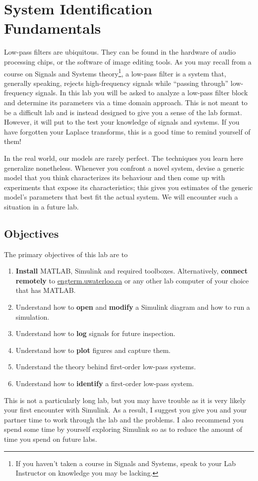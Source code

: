 \chapter{System Identification Fundamentals}\label{Lab:1}
Low-pass filters are ubiquitous. They can be found in the hardware of
audio processing chips, or the software of image editing tools. As you may
recall from a course on Signals and Systems theory\footnote{If you haven't
taken a course in Signals and Systems, speak to your Lab Instructor on
knowledge you may be lacking.}, a low-pass filter
is a system that, generally speaking, rejects high-frequency signals while
``passing through'' low-frequency signals. In this lab you will be asked
to analyze a low-pass filter block and determine its parameters via a time
domain approach. This is not meant to be a difficult lab and is instead
designed to give you a sense of the lab format. However, it will put to the
test your knowledge of signals and systems. If you have forgotten your
Laplace transforms, this is a good time to remind yourself of them!

In the real world, our models are rarely perfect. The techniques
you learn here generalize nonetheless. Whenever you confront a novel system,
devise a generic model that you think characterizes its behaviour and then
come up with experiments that expose its characteristics; this gives you
estimates of the generic model's parameters that best fit the actual system.
We will encounter such a situation in a future lab.

\section{Objectives}
The primary objectives of this lab are to
\begin{enumerate}[label=(\arabic*)]
  \item{
    \textbf{Install} MATLAB, Simulink and required toolboxes.
    Alternatively, \textbf{connect remotely} to
    \url{engterm.uwaterloo.ca} or any other lab computer of your choice
    that has MATLAB.
  }
  \item{
    Understand how to \textbf{open} and \textbf{modify}
    a Simulink diagram and how to run a simulation.
  }
  \item{
    Understand how to \textbf{log} signals for future inspection.
  }
  \item{
    Understand how to \textbf{plot} figures and capture them.
  }
  \item{
    Understand the theory behind first-order low-pass systems.
  }
  \item{
    Understand how to \textbf{identify} a first-order low-pass system.
  }
\end{enumerate}
This is not a particularly long lab, but you may have trouble as it is
very likely your first encounter with Simulink. As a result, I suggest you
give you and your partner time to work through the lab and the problems.
I also recommend you spend some time by yourself exploring Simulink so as to
reduce the amount of time you spend on future labs.


